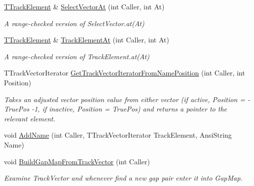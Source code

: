\begin{DoxyCompactItemize}
\mbox{\label{class_t_track_a9cddc7b9d02254d44e242ff14758d660}} 
\mbox{\hyperlink{class_t_track_element}{T\+Track\+Element}} \& \mbox{\hyperlink{class_t_track_a9cddc7b9d02254d44e242ff14758d660}{Select\+Vector\+At}} (int Caller, int At)
\begin{DoxyCompactList}\small\item\em A range-\/checked version of Select\+Vector.\+at(\+At) \end{DoxyCompactList}\item 
\mbox{\label{class_t_track_ad377e5a1f152f2e89832c0f9bcfd261f}} 
\mbox{\hyperlink{class_t_track_element}{T\+Track\+Element}} \& \mbox{\hyperlink{class_t_track_ad377e5a1f152f2e89832c0f9bcfd261f}{Track\+Element\+At}} (int Caller, int At)
\begin{DoxyCompactList}\small\item\em A range-\/checked version of Track\+Element.\+at(\+At) \end{DoxyCompactList}\item 
\mbox{\label{class_t_track_ae37fe26f1d8ed9ef0f498ae12347e0ac}} 
T\+Track\+Vector\+Iterator \mbox{\hyperlink{class_t_track_ae37fe26f1d8ed9ef0f498ae12347e0ac}{Get\+Track\+Vector\+Iterator\+From\+Name\+Position}} (int Caller, int Position)
\begin{DoxyCompactList}\small\item\em Takes an adjusted vector position value from either vector (if active, Position = -\/\+True\+Pos -\/1, if inactive, Position = True\+Pos) and returns a pointer to the relevant element. \end{DoxyCompactList}\item 
void \mbox{\hyperlink{class_t_track_a306dfdff414c8edf6f974d21bd9b83ce}{Add\+Name}} (int Caller, T\+Track\+Vector\+Iterator Track\+Element, Ansi\+String Name)
\item 
\mbox{\label{class_t_track_a1a3aca3dd4e4bdc7e4c3c254997c2c5a}} 
void \mbox{\hyperlink{class_t_track_a1a3aca3dd4e4bdc7e4c3c254997c2c5a}{Build\+Gap\+Map\+From\+Track\+Vector}} (int Caller)
\begin{DoxyCompactList}\small\item\em Examine Track\+Vector and whenever find a new gap pair enter it into Gap\+Map. \end{DoxyCompactList}\item 

\end{DoxyCompactItemize}

